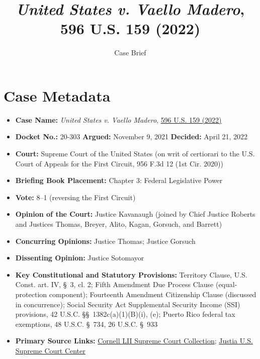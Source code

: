 \documentclass[12pt]{article}
\title{\textit{United States v. Vaello Madero}, 596 U.S. 159 (2022)}
\author{Case Brief}
\date{}
\begin{document}
\maketitle

\section{Case Metadata}
\begin{itemize}
  \item \textbf{Case Name:} \emph{United States v. Vaello Madero}, \href{https://supreme.justia.com/cases/federal/us/596/20-303/}{596 U.S. 159 (2022)}
  \item \textbf{Docket No.:} 20-303 \quad \textbf{Argued:} November 9, 2021 \quad \textbf{Decided:} April 21, 2022
  \item \textbf{Court:} Supreme Court of the United States (on writ of certiorari to the U.S. Court of Appeals for the First Circuit, 956 F.3d 12 (1st Cir. 2020))
  \item \textbf{Briefing Book Placement:} Chapter 3: Federal Legislative Power
  \item \textbf{Vote:} 8--1 (reversing the First Circuit)
  \item \textbf{Opinion of the Court:} Justice Kavanaugh (joined by Chief Justice Roberts and Justices Thomas, Breyer, Alito, Kagan, Gorsuch, and Barrett)
  \item \textbf{Concurring Opinions:} Justice Thomas; Justice Gorsuch
  \item \textbf{Dissenting Opinion:} Justice Sotomayor
  \item \textbf{Key Constitutional and Statutory Provisions:} Territory Clause, U.S. Const. art. IV, \S~3, cl. 2; Fifth Amendment Due Process Clause (equal-protection component); Fourteenth Amendment Citizenship Clause (discussed in concurrence); Social Security Act Supplemental Security Income (SSI) provisions, 42 U.S.C. \S\S~1382c(a)(1)(B)(i), (e); Puerto Rico federal tax exemptions, 48 U.S.C. \S~734, 26 U.S.C. \S~933
  \item \textbf{Primary Source Links:} \href{https://www.law.cornell.edu/supremecourt/text/20-303}{Cornell LII Supreme Court Collection}; \href{https://supreme.justia.com/cases/federal/us/596/20-303/}{Justia U.S. Supreme Court Center}
\end{itemize}
\end{document}
